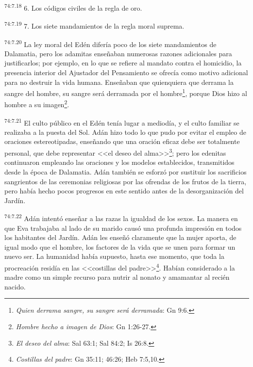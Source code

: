 \par
\textsuperscript{74:7.18} 6. Los códigos civiles de la regla de oro.

\par
\textsuperscript{74:7.19} 7. Los siete mandamientos de la regla moral suprema.

\par
\textsuperscript{74:7.20} La ley moral del Edén difería poco de los siete mandamientos de Dalamatia, pero los adamitas enseñaban numerosas razones adicionales para justificarlos; por ejemplo, en lo que se refiere al mandato contra el homicidio, la presencia interior del Ajustador del Pensamiento se ofrecía como motivo adicional para no destruir la vida humana. Enseñaban que \guillemotleft quienquiera que derrama la sangre del hombre, su sangre será derramada por el hombre\footnote{\textit{Quien derrama sangre, su sangre será derramada}: Gn 9:6.}, porque Dios hizo al hombre a su imagen\guillemotright\footnote{\textit{Hombre hecho a imagen de Dios}: Gn 1:26-27.}.

\par
\textsuperscript{74:7.21} El culto público en el Edén tenía lugar a mediodía, y el culto familiar se realizaba a la puesta del Sol. Adán hizo todo lo que pudo por evitar el empleo de oraciones estereotipadas, enseñando que una oración eficaz debe ser totalmente personal, que debe representar <<el deseo del alma>>\footnote{\textit{El deseo del alma}: Sal 63:1; Sal 84:2; Is 26:8.}; pero los edenitas continuaron empleando las oraciones y los modelos establecidos, transmitidos desde la época de Dalamatia. Adán también se esforzó por sustituir los sacrificios sangrientos de las ceremonias religiosas por las ofrendas de los frutos de la tierra, pero había hecho pocos progresos en este sentido antes de la desorganización del Jardín.

\par
\textsuperscript{74:7.22} Adán intentó enseñar a las razas la igualdad de los sexos. La manera en que Eva trabajaba al lado de su marido causó una profunda impresión en todos los habitantes del Jardín. Adán les enseñó claramente que la mujer aporta, de igual modo que el hombre, los factores de la vida que se unen para formar un nuevo ser. La humanidad había supuesto, hasta ese momento, que toda la procreación residía en las <<costillas del padre>>\footnote{\textit{Costillas del padre}: Gn 35:11; 46:26; Heb 7:5,10.}. Habían considerado a la madre como un simple recurso para nutrir al nonato y amamantar al recién nacido.

